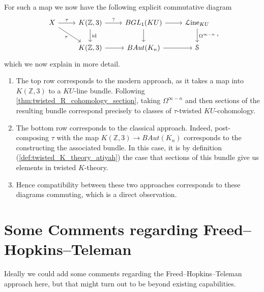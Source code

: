 \documentclass[a4paper]{book}
\newcommand{\lH}{\mathcal{H}}
\newcommand{\lL}{\mathcal{L}}
\newcommand{\lS}{\mathcal{S}}
\newcommand{\bZ}{\mathbb{Z}}
\renewcommand{\Line}{\lL\mathrm{ine}} %
\theoremstyle{definition}
\theoremstyle{remark}
\numberwithin{equation}{section}
\begin{document}
For such a map we now have the following explicit commutative diagram 
\[ 
\begin{tikzcd}
 X \arrow[dr, "\tau"'] \arrow[r, "\tau"] & {K(\bZ,3)} \arrow[r, "?"] \arrow[d, "\mathrm{id}"] & BGL_1(KU) \arrow[r] \arrow[d] & \Line_{KU} \arrow[d, "\Omega^{\infty - n}"] \\
 & {K(\bZ,3)} \arrow[r] & BAut(K_n) \arrow[r] & \lS
\end{tikzcd},
\]
which we now explain in more detail. 
\begin{enumerate}
	\item The top row corresponds to the modern approach, as it takes a map into $K(\bZ,3)$ to a $KU$-line bundle. Following \cref{thm:twisted_R_cohomology_section}, taking $\Omega^{\infty - n}$ and then sections of the resulting bundle correspond precisely to classes of $\tau$-twisted $KU$-cohomology.
	\item The bottom row corresponds to the classical approach. Indeed, post-composing $\tau$ with the map $K(\bZ,3) \to BAut(K_n)$ corresponds to the constructing the associated bundle. In this case, it is by definition (\cref{def:twisted_K_theory_atiyah}) the case that sections of this bundle give us elements in twisted $K$-theory. 
	\item Hence compatibility between these two approaches corresponds to these diagrams commuting, which is a direct observation.
\end{enumerate}





\section{Some Comments regarding Freed--Hopkins--Teleman}
Ideally we could add some comments regarding the Freed--Hopkins--Teleman approach here, but that might turn out to be beyond existing capabilities.
\end{document}

